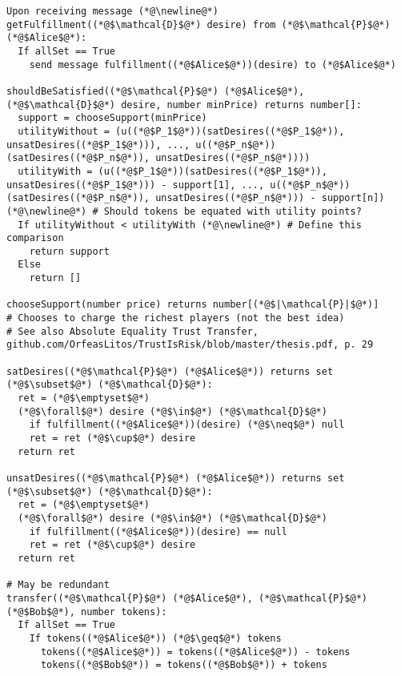 \begin{lstlisting}[label=satfunc, style=numbers]
Upon receiving message (*@\newline@*) getFulfillment((*@$\mathcal{D}$@*) desire) from (*@$\mathcal{P}$@*) (*@$Alice$@*):
  If allSet == True
    send message fulfillment((*@$Alice$@*))(desire) to (*@$Alice$@*)

shouldBeSatisfied((*@$\mathcal{P}$@*) (*@$Alice$@*), (*@$\mathcal{D}$@*) desire, number minPrice) returns number[]:
  support = chooseSupport(minPrice)
  utilityWithout = (u((*@$P_1$@*))(satDesires((*@$P_1$@*)), unsatDesires((*@$P_1$@*))), ..., u((*@$P_n$@*))(satDesires((*@$P_n$@*)), unsatDesires((*@$P_n$@*))))
  utilityWith = (u((*@$P_1$@*))(satDesires((*@$P_1$@*)), unsatDesires((*@$P_1$@*))) - support[1], ..., u((*@$P_n$@*))(satDesires((*@$P_n$@*)), unsatDesires((*@$P_n$@*))) - support[n]) (*@\newline@*) # Should tokens be equated with utility points?
  If utilityWithout < utilityWith (*@\newline@*) # Define this comparison
    return support
  Else
    return []

chooseSupport(number price) returns number[(*@$|\mathcal{P}|$@*)]
# Chooses to charge the richest players (not the best idea)
# See also Absolute Equality Trust Transfer, github.com/OrfeasLitos/TrustIsRisk/blob/master/thesis.pdf, p. 29  

satDesires((*@$\mathcal{P}$@*) (*@$Alice$@*)) returns set (*@$\subset$@*) (*@$\mathcal{D}$@*):
  ret = (*@$\emptyset$@*)
  (*@$\forall$@*) desire (*@$\in$@*) (*@$\mathcal{D}$@*)
    if fulfillment((*@$Alice$@*))(desire) (*@$\neq$@*) null
    ret = ret (*@$\cup$@*) desire
  return ret

unsatDesires((*@$\mathcal{P}$@*) (*@$Alice$@*)) returns set (*@$\subset$@*) (*@$\mathcal{D}$@*):
  ret = (*@$\emptyset$@*)
  (*@$\forall$@*) desire (*@$\in$@*) (*@$\mathcal{D}$@*)
    if fulfillment((*@$Alice$@*))(desire) == null
    ret = ret (*@$\cup$@*) desire
  return ret

# May be redundant
transfer((*@$\mathcal{P}$@*) (*@$Alice$@*), (*@$\mathcal{P}$@*) (*@$Bob$@*), number tokens):
  If allSet == True
    If tokens((*@$Alice$@*)) (*@$\geq$@*) tokens
      tokens((*@$Alice$@*)) = tokens((*@$Alice$@*)) - tokens
      tokens((*@$Bob$@*)) = tokens((*@$Bob$@*)) + tokens
\end{lstlisting}
